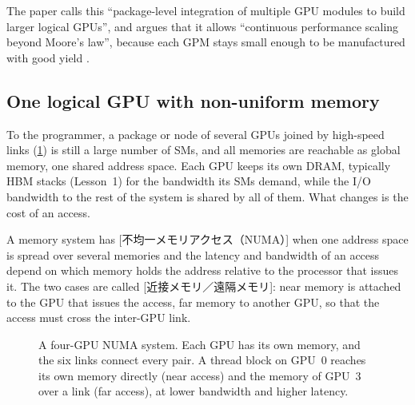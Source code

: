 \documentclass[../main.tex]{subfiles}
\begin{document}
The paper calls this \enquote{package-level integration of multiple GPU
modules to build larger logical GPUs}, and argues that it allows
\enquote{continuous performance scaling beyond Moore's law}, because
each GPM stays small enough to be manufactured with good yield
\cite{arunkumar2017mcmgpu}.

\subsection{One logical GPU with non-uniform memory}

To the programmer, a package or node of several GPUs joined by
high-speed links (\cref{fig:l09-numa}) is still a large number of SMs,
and all memories are reachable as global memory, one shared address
space.  Each GPU keeps its own DRAM, typically HBM stacks (Lesson~1)
for the bandwidth its SMs demand, while the I/O bandwidth to the rest of
the system is shared by all of them.  What changes is the cost of an
access.

\begin{definition}
  A memory system has
  [不均一メモリアクセス（NUMA）]
  when one address space is spread over several memories and the latency
  and bandwidth of an access depend on which memory holds the address
  relative to the processor that issues it.
  The two cases are called
  [近接メモリ／遠隔メモリ]: near memory
  is attached to the GPU that issues the access, far memory to another
  GPU, so that the access must cross the inter-GPU link.
\end{definition}

\begin{figure}[tb]
  \centering
  
  \caption{A four-GPU NUMA system.  Each GPU has its own memory, and the
    six links connect every pair.  A thread block on GPU~0 reaches its
    own memory directly (near access) and the memory of GPU~3 over a link
    (far access), at lower bandwidth and higher latency.}
  \label{fig:l09-numa}
\end{figure}
\end{document}
